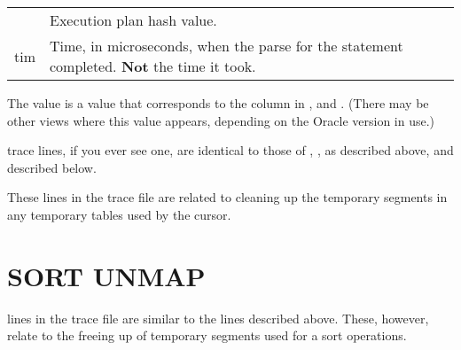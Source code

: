 \begin{longtable}[]{@{}l|l@{}}
\begin{minipage}[t]{0.14\columnwidth}
    \end{minipage} & \begin{minipage}[t]{0.65\columnwidth}\raggedright\strut
        Execution plan hash value.\strut
    \end{minipage}\tabularnewline
    \begin{minipage}[t]{0.14\columnwidth}\raggedright\strut
        tim\strut
    \end{minipage} & \begin{minipage}[t]{0.65\columnwidth}\raggedright\strut
        Time, in microseconds, when the parse for the statement completed.
        \textbf{Not} the time it took.\strut
    \end{minipage}\tabularnewline
    \bottomrule
\end{longtable}

The  value is a value that corresponds to the column  in ,  and . (There may be other views where this value appears, depending on the Oracle version in use.)


 trace lines, if you ever see one, are identical to those of , ,   as described above, and  described below. 

These lines in the trace file are related to cleaning up the temporary segments in any temporary tables used by the cursor.


\newpage\section{SORT UNMAP}\label{sort-unmap}

 lines in the trace file are similar to the  lines described above. These, however, relate to the freeing up of temporary segments used for a sort operations.

